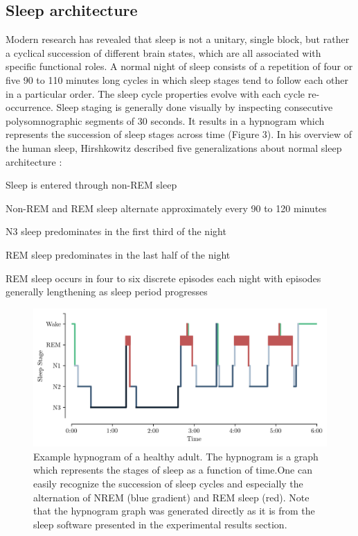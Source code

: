\subsection{Sleep architecture}
\label{sec:dream-research:sleep:architecture}

Modern research has revealed that sleep is not a unitary, single block, but rather a cyclical succession of different brain states, which are all associated with specific functional roles. A normal night of sleep consists of a repetition of four or five 90 to 110 minutes long cycles in which sleep stages tend to follow each other in a particular order. The sleep cycle properties evolve with each cycle re-occurrence. Sleep staging is generally done visually by inspecting consecutive polysomnographic segments of 30 seconds. It results in a hypnogram which represents the succession of sleep stages across time (Figure 3). In his overview of the human sleep, Hirshkowitz described five generalizations about normal sleep architecture \citep{hirshkowitz_normal_2004}:

\begin{my_list_num}
    \item Sleep is entered through non-REM sleep
    \item Non-REM and REM sleep alternate approximately every 90 to 120 minutes
	\item N3 sleep predominates in the first third of the night
	\item REM sleep predominates in the last half of the night
	\item REM sleep occurs in four to six discrete episodes each night with episodes generally lengthening as sleep period progresses
\end{my_list_num}

\begin{figure}[htb]
	\includegraphics[width=\textwidth]{Fig/Intro/Intro_Hypnogram/Intro_Hypnogram.png}
	\caption[Example hypnogram of a healthy adult]{Example hypnogram of a healthy adult. The hypnogram is a graph which represents the stages of sleep as a function of time.One can easily recognize the succession of sleep cycles and especially the alternation of NREM (blue gradient) and REM sleep (red). Note that the hypnogram graph was generated directly as it is from the sleep software presented in the experimental results section.}
	\label{fig:intro:hypno}
\end{figure}

